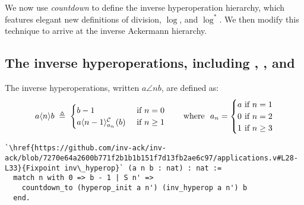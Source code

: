 We now use \emph{countdown} to define the inverse
hyperoperation hierarchy, which features elegant new definitions of
division, $\log$, and $\log^{*}$.
We then modify this technique to arrive at the inverse
Ackermann hierarchy.

\subsection{The inverse hyperoperations, including , , and }

\begin{defn} \label{defn: inv-hyperop}
	The inverse hyperoperations, written $a\angle{n}b$, are defined as:
	\begin{equation}
	a\angle{n}b \; \triangleq \; \begin{cases}
	b - 1 & \hspace{-10pt} \quad \text{ if } n = 0 \\
	\cdt{a\angle{n-1}}{a_n}(b) & \hspace{-10pt} \quad \text{ if } n \ge 1
	\end{cases}
	\ \ \quad \text{ where } \ a_n = \begin{cases}
	a & \hspace{-10pt}\text{ if } n = 1 \\
	0 & \hspace{-10pt}\text{ if } n = 2 \\
	1 & \hspace{-10pt}\text{ if } n \ge 3
	\end{cases}
	\end{equation}
\begin{lstlisting}
`\href{https://github.com/inv-ack/inv-ack/blob/7270e64a2600b771f2b1b1b151f7d13fb2ae6c97/applications.v#L28-L33}{Fixpoint inv\_hyperop}` (a n b : nat) : nat :=
  match n with 0 => b - 1 | S n' =>
    countdown_to (hyperop_init a n') (inv_hyperop a n') b
  end.
\end{lstlisting}
\end{defn}
